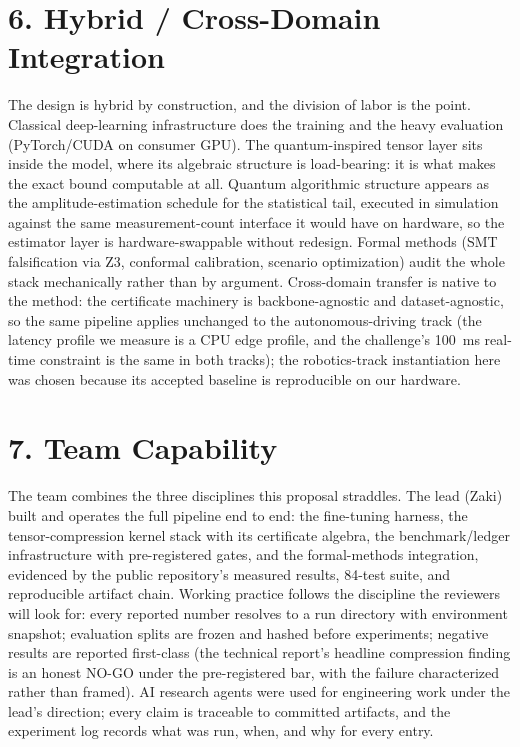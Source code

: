 \documentclass[10pt]{article}
\begin{document}
\section*{6. Hybrid / Cross-Domain Integration}
The design is hybrid by construction, and the division of labor is the point.
Classical deep-learning infrastructure does the training and the heavy
evaluation (PyTorch/CUDA on consumer GPU). The quantum-inspired tensor layer
sits inside the model, where its algebraic structure is load-bearing: it is
what makes the exact bound computable at all. Quantum algorithmic structure
appears as the amplitude-estimation schedule for the statistical tail,
executed in simulation against the same measurement-count interface it would
have on hardware, so the estimator layer is hardware-swappable without
redesign. Formal methods (SMT falsification via Z3, conformal calibration,
scenario optimization) audit the whole stack mechanically rather than by
argument. Cross-domain transfer is native to the method: the certificate
machinery is backbone-agnostic and dataset-agnostic, so the same pipeline
applies unchanged to the autonomous-driving track (the latency profile we
measure is a CPU edge profile, and the challenge's 100~ms real-time constraint
is the same in both tracks); the robotics-track instantiation here was chosen
because its accepted baseline is reproducible on our hardware.

\section*{7. Team Capability}
The team combines the three disciplines this proposal straddles.
The lead (Zaki) built and operates the full pipeline end to end: the
fine-tuning harness, the tensor-compression kernel stack with its certificate
algebra, the benchmark/ledger infrastructure with pre-registered gates, and
the formal-methods integration, evidenced by the public repository's
measured results, 84-test suite, and reproducible artifact chain. Working
practice follows the discipline the reviewers will look for: every reported
number resolves to a run directory with environment snapshot; evaluation
splits are frozen and hashed before experiments; negative results are
reported first-class (the technical report's headline compression finding is
an honest NO-GO under the pre-registered bar, with the failure characterized
rather than framed). AI research agents were used for engineering work
under the lead's direction; every claim is traceable to committed artifacts,
and the experiment log records what was run, when, and why for every entry.
\end{document}
